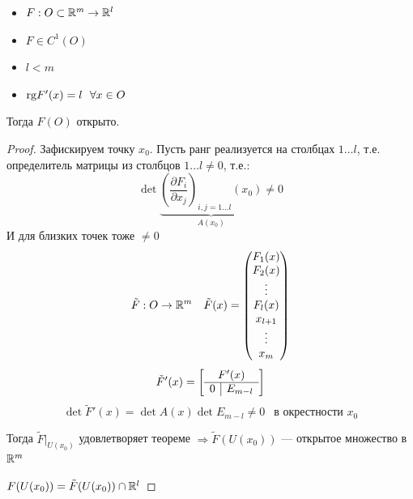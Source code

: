 \begin{corollary}\itemfix
    \begin{itemize}
        \item $F : O\subset\mathbb{R}^m \to\mathbb{R}^l$
        \item $F \in C^1(O)$
        \item $l < m$
        \item $\text{rg} F'(x) = l \ \ \forall x\in O$
    \end{itemize}
    Тогда $F(O)$ открыто.
\end{corollary}
\begin{proof}
    Зафискируем точку $x_0$. Пусть ранг реализуется на столбцах $1\ldots l$, т.е. определитель матрицы из столбцов $1\ldots l \not=0$, т.е.:
    $$\det\underbrace{\left(\frac{\partial F_i}{\partial x_j}\right)_{i, j = 1\ldots l}(x_0)}_{A(x_0)} \not = 0$$
    И для близких точек тоже $\not=0$
    $$\tilde F : O \to\mathbb{R}^m \quad \tilde F(x) = \begin{pmatrix}
            F_1(x)  \\
            F_2(x)  \\
            \vdots  \\
            F_l(x)  \\
            x_{l+1} \\
            \vdots  \\
            x_m
        \end{pmatrix}$$
    $$\tilde F'(x) = \left[\begin{array}{cc}
                \multicolumn{2}{c}{F'(x)}        \\
                \hline
                \multicolumn{1}{c|}{0} & E_{m-l} \\
            \end{array}\right]$$
    $$\det \tilde F'(x) = \det A(x) \det E_{m-l} \not= 0 \ \ \text{ в окрестности } x_0$$

    Тогда $\tilde F\Big|_{U(x_0)}$ удовлетворяет теореме $\Rightarrow \tilde F(U(x_0))$ --- открытое множество в $\mathbb{R}^m$

    $F(U(x_0)) = \tilde F(U(x_0)) \cap \mathbb{R}^l$
\end{proof}

